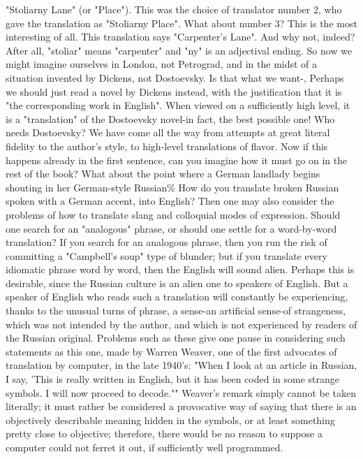 "Stoliarny Lane" (or "Place"). This was the choice of translator number 2, who gave the
translation as "Stoliarny Place".
         What about number 3? This is the most interesting of all. This translation says
"Carpenter's Lane". And why not, indeed? After all, "stoliar" means "carpenter" and "ny"
is an adjectival ending. So now we might imagine ourselves in London, not Petrograd,
and in the midst of a situation invented by Dickens, not Dostoevsky. Is that what we
want-, Perhaps we should just read a novel by Dickens instead, with the justification that
it is "the corresponding work in English". When viewed on a sufficiently high level, it is
a "translation" of the Dostoevsky novel-in fact, the best possible one! Who needs
Dostoevsky?
         We have come all the way from attempts at great literal fidelity to the author's
style, to high-level translations of flavor. Now if this happens already in the first
sentence, can you imagine how it must go on in the rest of the book? What about the
point where a German landlady begins shouting in her German-style Russian\% How do
you translate broken Russian spoken with a German accent, into English?
         Then one may also consider the problems of how to translate slang and colloquial
modes of expression. Should one search for an "analogous" phrase, or should one settle
for a word-by-word translation? If you search for an analogous phrase, then you run the
risk of committing a "Campbell's soup" type of blunder; but if you translate every
idiomatic phrase word by word, then the English will sound alien. Perhaps this is
desirable, since the Russian culture is an alien one to speakers of English. But a speaker
of English who reads such a translation will constantly be experiencing, thanks to the
unusual turns of phrase, a sense-an artificial sense-of strangeness, which was not intended
by the author, and which is not experienced by readers of the Russian original.
         Problems such as these give one pause in considering such statements as this one,
made by Warren Weaver, one of the first advocates of translation by computer, in the late
1940's: "When I look at an article in Russian, I say, 'This is really written in English, but
it has been coded in some strange symbols. I will now proceed to decode."" Weaver's
remark simply cannot be taken literally; it must rather be considered a provocative way of
saying that there is an objectively describable meaning hidden in the symbols, or at least
something pretty close to objective; therefore, there would be no reason to suppose a
computer could not ferret it out, if sufficiently well programmed.


